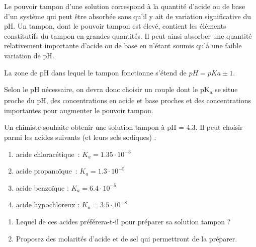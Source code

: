\documentclass[
  11pt,
  french,
  a4paper,
  openany]{book}
\providecommand{\tightlist}{%
  \setlength{\itemsep}{0pt}\setlength{\parskip}{0pt}}
\begin{document}
Le pouvoir tampon d'une solution correspond à la quantité d'acide ou de base d'un système qui peut être absorbée sans qu'il y ait de variation significative du pH. Un tampon, dont le pouvoir tampon est élevé, contient les éléments constitutifs du tampon en grandes quantités. Il peut ainsi absorber une quantité relativement importante d'acide ou de base en n'étant soumis qu'à une faible variation de pH.

La zone de pH dans lequel le tampon fonctionne s'étend de \(pH = pKa \pm 1\).

Selon le pH nécessaire, on devra donc choisir un couple dont le pK\textsubscript{a} se situe proche du pH, des concentrations en acide et base proches et des concentrations importantes pour augmenter le pouvoir tampon.

\clearpage

\begin{Exercise}

Un chimiste souhaite obtenir une solution tampon à pH = 4.3. Il peut choisir parmi les acides suivants (et leurs sels sodiques) :

\begin{enumerate}
\def\labelenumi{\alph{enumi}.}
\tightlist
\item
  acide chloracétique~: \(K_a = 1.35 \cdot 10^{-3}\)
\item
  acide propanoïque~: \(K_a = 1.3 \cdot 10^{-5}\)
\item
  acide benzoïque : \(K_a = 6.4 \cdot 10^{-5}\)
\item
  acide hypochloreux : \(K_a = 3.5 \cdot 10^{-8}\)
\end{enumerate}

\begin{enumerate}
\def\labelenumi{\arabic{enumi}.}
\tightlist
\item
  Lequel de ces acides préférera-t-il pour préparer sa solution tampon ?
\item
  Proposez des molarités d'acide et de sel qui permettront de la préparer.\\
\end{enumerate}


\end{Exercise}
\end{document}
